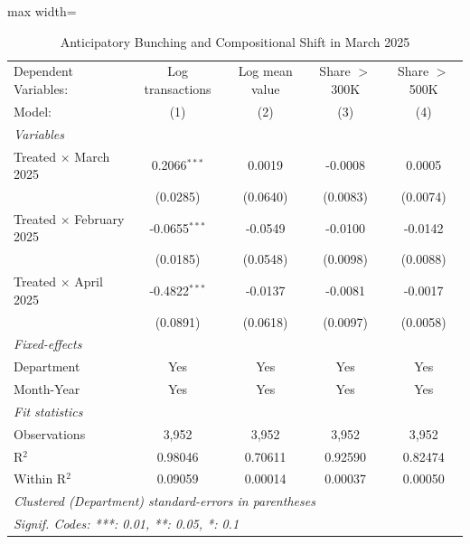 \begin{table}[htbp]
   \caption{\label{tab:main} Anticipatory Bunching and Compositional Shift in March 2025}
   \centering
   \begin{adjustbox}{max width=\textwidth}
   \begin{tabular}{lcccc}
      \tabularnewline \midrule \midrule
      Dependent Variables:            & Log transactions & Log mean value & Share $>$300K & Share $>$500K\\  
      Model:                          & (1)              & (2)            & (3)           & (4)\\  
      \midrule
      \emph{Variables}\\
      Treated $\times$ March 2025     & 0.2066$^{***}$   & 0.0019         & -0.0008       & 0.0005\\   
                                      & (0.0285)         & (0.0640)       & (0.0083)      & (0.0074)\\   
      Treated $\times$ February 2025  & -0.0655$^{***}$  & -0.0549        & -0.0100       & -0.0142\\   
                                      & (0.0185)         & (0.0548)       & (0.0098)      & (0.0088)\\   
      Treated $\times$ April 2025     & -0.4822$^{***}$  & -0.0137        & -0.0081       & -0.0017\\   
                                      & (0.0891)         & (0.0618)       & (0.0097)      & (0.0058)\\   
      \midrule
      \emph{Fixed-effects}\\
      Department                      & Yes              & Yes            & Yes           & Yes\\  
      Month-Year                      & Yes              & Yes            & Yes           & Yes\\  
      \midrule
      \emph{Fit statistics}\\
      Observations                    & 3,952            & 3,952          & 3,952         & 3,952\\  
      R$^2$                           & 0.98046          & 0.70611        & 0.92590       & 0.82474\\  
      Within R$^2$                    & 0.09059          & 0.00014        & 0.00037       & 0.00050\\  
      \midrule \midrule
      \multicolumn{5}{l}{\emph{Clustered (Department) standard-errors in parentheses}}\\
      \multicolumn{5}{l}{\emph{Signif. Codes: ***: 0.01, **: 0.05, *: 0.1}}\\
   \end{tabular}
   \end{adjustbox}


\end{table}
